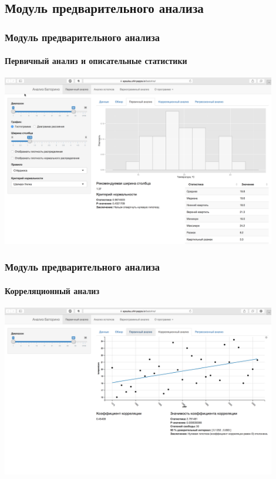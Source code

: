 \documentclass{beamer}
\begin{document}
\subsection{Модуль предварительного анализа}
\begin{frame}
  \frametitle{Модуль предварительного анализа}
  \framesubtitle{Первичный анализ и описательные статистики}
  \begin{center}
    \includegraphics[width=0.9\textwidth]{../../figures/static/1_basis.png}
  \end{center}
\end{frame}

\begin{frame}
  \frametitle{Модуль предварительного анализа}
  \framesubtitle{Корреляционный анализ}
  \begin{center}
    \includegraphics[width=0.9\textwidth]{../../figures/static/p_corr.png}
  \end{center}
\end{frame}
\end{document}
